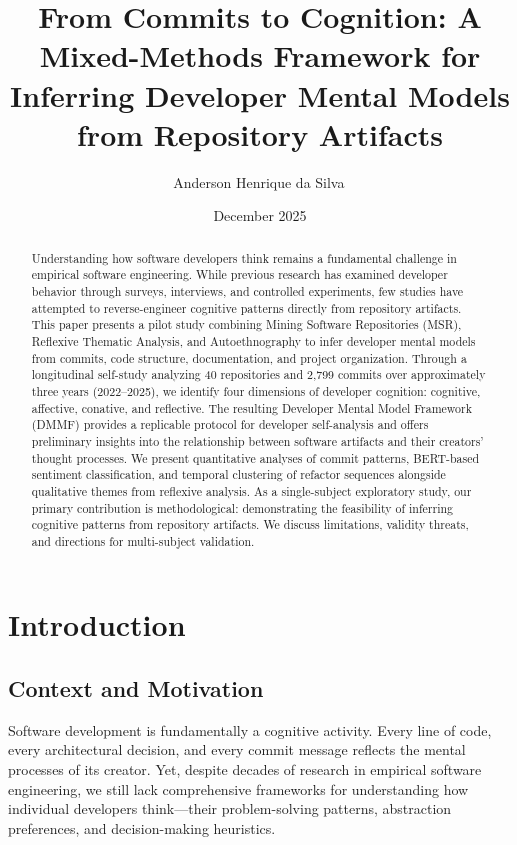 \documentclass{ntlabs-preprint}
\title{From Commits to Cognition: A Mixed-Methods Framework for Inferring Developer Mental Models from Repository Artifacts}
\author[1,2]{Anderson Henrique da Silva\,\orcidlink{0009-0001-7144-4974}}
\affil[1]{\href{https://ntlabs.dev}{NTLabs.dev}}
\affil[2]{IFSULDEMINAS, Minas Gerais, Brasil}
\affil[ ]{\href{mailto:anderson@ntlabs.dev}{anderson@ntlabs.dev}}
\date{December 2025}
\begin{document}
\maketitle

\begin{abstract}
Understanding how software developers think remains a fundamental challenge in empirical software engineering. While previous research has examined developer behavior through surveys, interviews, and controlled experiments, few studies have attempted to reverse-engineer cognitive patterns directly from repository artifacts. This paper presents a pilot study combining Mining Software Repositories (MSR), Reflexive Thematic Analysis, and Autoethnography to infer developer mental models from commits, code structure, documentation, and project organization. Through a longitudinal self-study analyzing 40 repositories and 2,799 commits over approximately three years (2022--2025), we identify four dimensions of developer cognition: cognitive, affective, conative, and reflective. The resulting Developer Mental Model Framework (DMMF) provides a replicable protocol for developer self-analysis and offers preliminary insights into the relationship between software artifacts and their creators' thought processes. We present quantitative analyses of commit patterns, BERT-based sentiment classification, and temporal clustering of refactor sequences alongside qualitative themes from reflexive analysis. As a single-subject exploratory study, our primary contribution is methodological: demonstrating the feasibility of inferring cognitive patterns from repository artifacts. We discuss limitations, validity threats, and directions for multi-subject validation.
\end{abstract}


\section{Introduction}

\subsection{Context and Motivation}

Software development is fundamentally a cognitive activity. Every line of code, every architectural decision, and every commit message reflects the mental processes of its creator. Yet, despite decades of research in empirical software engineering, we still lack comprehensive frameworks for understanding how individual developers think---their problem-solving patterns, abstraction preferences, and decision-making heuristics.
\end{document}
